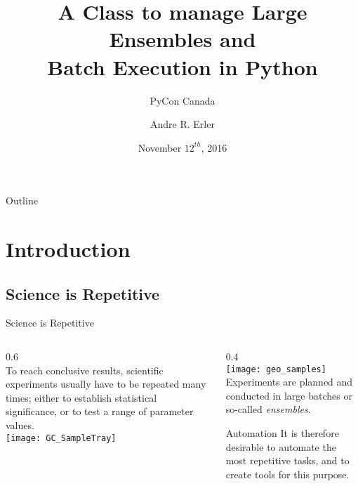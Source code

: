 \documentclass[hyperref={pdfpagelabels=false},compress,final]{beamer}
\title[Large Ensembles and Batch Execution with Python]{A Class to manage Large Ensembles and \\ Batch Execution in Python}
\subtitle{\bigskip PyCon Canada}
\author[\href{http://www.physics.utoronto.ca/~aerler/}{Andre R. Erler} (\href{mailto:A.R.Erler@gmail.com}{A.R.Erler@gmail.com})]{Andre R. Erler}
\institute{\texttt{[image: aquanty-Logo\_transparent]}\\ \bigskip}
\date{November $12^{th}$, 2016}
\newenvironment{myGreenBox}[3][upper=upgreen,lower=lowgreen,shadow=true]%
{\begin{center} \begin{minipage}{#2} \begin{beamerboxesrounded}[#1]{#3} \smallskip}%
      {\smallskip \end{beamerboxesrounded} \end{minipage} \end{center}}
\begin{document}

\begin{frame}
\titlepage
\end{frame}

\begin{frame}{Outline}
\tableofcontents%
\end{frame}




\section{Introduction}


\subsection[Repetitive Science]{Science is Repetitive}

\begin{frame}{Science is Repetitive}
 \begin{columns}
   \begin{column}{0.6\textwidth}
     \small \medskip\\
     To reach conclusive results, scientific experiments usually have to be repeated many times; either to establish statistical significance, or to test a range of parameter values.\\ 
     \bigskip 
     \hspace*{-1cm}
     \texttt{[image: GC\_SampleTray]}
   \end{column}
   \begin{column}{0.4\textwidth}
     \vspace*{-1.cm}\\%
     \texttt{[image: geo\_samples]}\\
    \bigskip 
     \small Experiments are planned and conducted in large batches or so-called \textit{ensembles}.\\ \smallskip
     \begin{myGreenBox}[shadow=true]{0.85\textwidth}{Automation}
       \small It is therefore desirable to automate the most repetitive tasks, and to create tools for this purpose.
     \end{myGreenBox}
  \end{column}
 \end{columns}
\end{frame}
\end{document}
